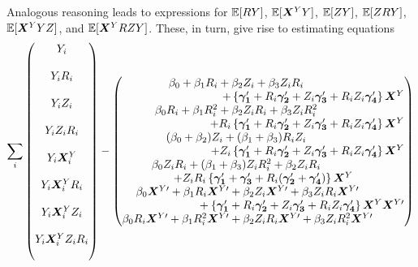 \documentclass{statsoc} %
\begin{document}
Analogous reasoning leads to expressions for $\mathbb{E}[RY]$, $\mathbb{E}[\bm{X}^Y Y]$, $\mathbb{E}[ZY]$,  $\mathbb{E}[ZRY]$, $\mathbb{E}[\bm{X}^Y YZ]$, and $\mathbb{E}[\bm{X}^Y RZY]$.
These, in turn, give rise to estimating equations
\begin{equation*}
  \displaystyle\sum_i \begin{pmatrix}
  Y_i\\
  \phantom{}\\
  Y_i\ri\\
    \phantom{}\\
  Y_iZ_i\\
  \phantom{}\\
  Y_iZ_i\ri\\
  \phantom{}\\
  Y_i\bxy_i\\
  \phantom{}\\
  Y_i\bxy_i\ri\\
  \phantom{}\\
  Y_i\bxy_iZ_i\\
  \phantom{}\\
  Y_i\bxy_iZ_i\ri\\
  \phantom{}\end{pmatrix} - \begin{pmatrix}
    \beta_0+\beta_1R_i+\beta_2Z_i+\beta_3Z_iR_i\phantom{-----}\\
    \hfill+\left\{\bm{\gamma_1}'+R_i\bm{\gamma_2}'+Z_i\bm{\gamma_3}'+R_iZ_i\bm{\gamma_4}'\right\}\bxy\\
    \beta_0\ri+\beta_1R_i^2+\beta_2Z_i\ri+\beta_3Z_iR_i^2\phantom{-----}\\
    \hfill+\ri\left\{\bm{\gamma_1}'+R_i\bm{\gamma_2}'+Z_i\bm{\gamma_3}'+R_iZ_i\bm{\gamma_4}'\right\}\bxy\\
    (\beta_0+\beta_2)Z_i+(\beta_1+\beta_3)R_iZ_i\phantom{-----}\\
    \hfill+Z_i\left\{\bm{\gamma_1}'+R_i\bm{\gamma_2}'+Z_i\bm{\gamma_3}'+R_iZ_i\bm{\gamma_4}'\right\}\bxy\\
    \beta_0Z_i\ri+(\beta_1+\beta_3)Z_iR_i^2+\beta_2Z_i\ri\phantom{-----}\\
    \hfill+Z_iR_i\left\{\bm{\gamma_1}'+\bm{\gamma_3}'+R_i(\bm{\gamma_2}'+\bm{\gamma_4}')\right\}\bxy \hfill\\
    \beta_0\bxyt+\beta_1R_i\bxyt+\beta_2Z_i\bxyt+\beta_3Z_iR_i\bxyt\phantom{---}\\
    \hfill {}+\left\{\bm{\gamma_1}'+R_i\bm{\gamma_2}'+Z_i\bm{\gamma_3}'+R_iZ_i\bm{\gamma_4}'\right\}\bxy\bxyt\\
    \beta_0\ri\bxyt+\beta_1R_i^2\bxyt+\beta_2Z_i\ri\bxyt+\beta_3Z_iR_i^2\bxyt\phantom{---}\\

\end{pmatrix}
\end{equation*}
\end{document}
